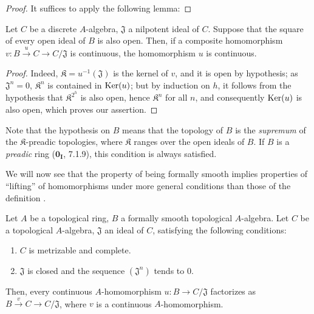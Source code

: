 \begin{proof}
It suffices to apply the following lemma:
\end{proof}

\begin{lemma}[19.3.8.1]
\label{0.19.3.8.1}
Let $C$ be a discrete $A$-algebra, $\mathfrak{J}$ a nilpotent ideal of $C$.
Suppose that the square of every open ideal of $B$ is also open.
Then, if a composite homomorphism $v:B\xrightarrow{u}C\to C/\mathfrak{J}$ is continuous, the homomorphism $u$ is continuous.
\end{lemma}

\begin{proof}
Indeed, $\mathfrak K=u^{-1}(\mathfrak{J})$ is the kernel of $v$, and it is open by hypothesis;
as $\mathfrak{J}^n=0$, $\mathfrak K^n$ is contained in $\operatorname{Ker}(u)$;
but by induction on $h$, it follows from the hypothesis that $\mathfrak K^{2^h}$ is also open, hence $\mathfrak K^n$ for all $n$, and consequently $\operatorname{Ker}(u)$ is also open, which proves our assertion.
\end{proof}

Note that the hypothesis on $B$ means that the topology of $B$ is the
\emph{supremum} of the $\mathfrak K$-preadic topologies, where $\mathfrak K$ ranges
over the open ideals of $B$. If $B$ is a \emph{preadic} ring ($\mathbf{0_I}$, 7.1.9),
this condition is always satisfied.

\begin{env}[19.3.9]
\label{0.19.3.9}
We will now see that the property of being formally smooth implies properties of ``lifting'' of homomorphisms under more general conditions than those of the definition .
\end{env}


\begin{proposition}[19.3.10]
\label{0.19.3.10}
Let $A$ be a topological ring, $B$ a formally smooth topological $A$-algebra.
Let $C$ be a topological $A$-algebra, $\mathfrak{J}$ an ideal of $C$, satisfying the following conditions:
\begin{enumerate}
  \item[$1^\circ$] $C$ is metrizable and complete.
  \item[$2^\circ$] $\mathfrak{J}$ is closed and the sequence $(\mathfrak{J}^n)$ tends to $0$.
\end{enumerate}
Then, every continuous $A$-homomorphism $u:B\to C/\mathfrak{J}$ factorizes as $B\xrightarrow{v}C\to C/\mathfrak{J}$, where $v$ is a continuous $A$-homomorphism.
\end{proposition}

